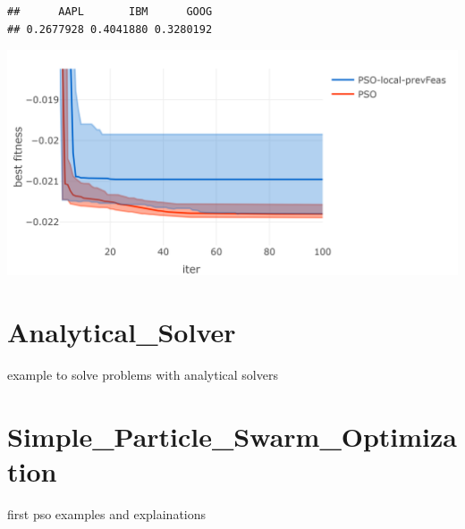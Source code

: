 \documentclass[
  oneside]{book}
\begin{document}
\begin{verbatim}
##      AAPL       IBM      GOOG 
## 0.2677928 0.4041880 0.3280192
\end{verbatim}

\includegraphics{Master_Thesis_files/figure-latex/unnamed-chunk-14-1.png}

\hypertarget{analytical_solver}{%
\chapter{Analytical\_Solver}\label{analytical_solver}}

example to solve problems with analytical solvers

\hypertarget{simple_particle_swarm_optimization}{%
\chapter{Simple\_Particle\_Swarm\_Optimization}\label{simple_particle_swarm_optimization}}

first pso examples and explainations

  
\end{document}
